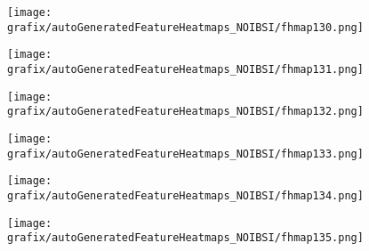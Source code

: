 \begin{subfigure}{\wid\textwidth} 
    \centering 
    \caption{\tiny \sffamily {}} 
    \vspace{\vsp} 
    \texttt{[image: grafix/autoGeneratedFeatureHeatmaps\_NOIBSI/fhmap130.png]} 
\end{subfigure} 
\hspace{\hsp} 
\begin{subfigure}{\wid\textwidth} 
    \centering 
    \caption{\tiny \sffamily {}} 
    \vspace{\vsp} 
    \texttt{[image: grafix/autoGeneratedFeatureHeatmaps\_NOIBSI/fhmap131.png]} 
\end{subfigure} 
\hspace{\hsp} 
\begin{subfigure}{\wid\textwidth} 
    \centering 
    \caption{\tiny \sffamily {}} 
    \vspace{\vsp} 
    \texttt{[image: grafix/autoGeneratedFeatureHeatmaps\_NOIBSI/fhmap132.png]} 
\end{subfigure} 
\hspace{\hsp} 
\begin{subfigure}{\wid\textwidth} 
    \centering 
    \caption{\tiny \sffamily {}} 
    \vspace{\vsp} 
    \texttt{[image: grafix/autoGeneratedFeatureHeatmaps\_NOIBSI/fhmap133.png]} 
\end{subfigure} 
\hspace{\hsp} 
\begin{subfigure}{\wid\textwidth} 
    \centering 
    \caption{\tiny \sffamily {}} 
    \vspace{\vsp} 
    \texttt{[image: grafix/autoGeneratedFeatureHeatmaps\_NOIBSI/fhmap134.png]} 
\end{subfigure} 
\hspace{\hsp} 
\begin{subfigure}{\wid\textwidth} 
    \centering 
    \caption{\tiny \sffamily {}} 
    \vspace{\vsp} 
    \texttt{[image: grafix/autoGeneratedFeatureHeatmaps\_NOIBSI/fhmap135.png]} 
\end{subfigure} 
\hspace{\hsp} 
\begin{subfigure}{\wid\textwidth} 
    \centering 
    \caption{\small \sffamily {}} 
\end{subfigure} 
